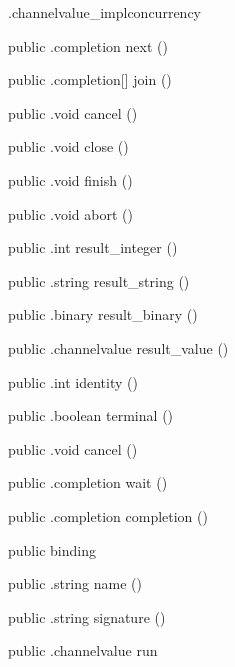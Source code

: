 \begin{CrexxClass}{.channelvalue\_impl}{concurrency}
\begin{Members}
    \Method
      {public}
      {.completion}
      {next}
      {()}

    \Method
      {public}
      {.completion[]}
      {join}
      {()}

    \Method
      {public}
      {.void}
      {cancel}
      {()}

    \Method
      {public}
      {.void}
      {close}
      {()}

    \Method
      {public}
      {.void}
      {finish}
      {()}

    \Method
      {public}
      {.void}
      {abort}
      {()}

    \Method
      {public}
      {.int}
      {result\_integer}
      {()}

    \Method
      {public}
      {.string}
      {result\_string}
      {()}

    \Method
      {public}
      {.binary}
      {result\_binary}
      {()}

    \Method
      {public}
      {.channelvalue}
      {result\_value}
      {()}

    \Method
      {public}
      {.int}
      {identity}
      {()}

    \Method
      {public}
      {.boolean}
      {terminal}
      {()}

    \Method
      {public}
      {.void}
      {cancel}
      {()}

    \Method
      {public}
      {.completion}
      {wait}
      {()}

    \Method
      {public}
      {.completion}
      {completion}
      {()}

    \Factory
      {public}
      {binding}
      {}

    \Method
      {public}
      {.string}
      {name}
      {()}

    \Method
      {public}
      {.string}
      {signature}
      {()}

    \Method
      {public}
      {.channelvalue}
      {run}
      {}


\end{Members}
\end{CrexxClass}
